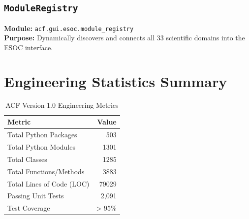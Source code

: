 \documentclass[11pt,a4paper,oneside]{report}
\begin{document}
\section{\texttt{ModuleRegistry}}
\textbf{Module:} \texttt{acf.gui.esoc.module_registry}\\
\textbf{Purpose:} Dynamically discovers and connects all 33 scientific domains into the ESOC interface.

\chapter{Engineering Statistics Summary}
\begin{table}[h!]
\centering
\caption{ACF Version 1.0 Engineering Metrics}
\begin{tabular}{lr}
\toprule
\textbf{Metric} & \textbf{Value} \\
\midrule
Total Python Packages & 503 \\
Total Python Modules & 1301 \\
Total Classes & 1285 \\
Total Functions/Methods & 3883 \\
Total Lines of Code (LOC) & 79029 \\
Passing Unit Tests & 2,091 \\
Test Coverage & > 95\% \\
\bottomrule
\end{tabular}
\end{table}
\end{document}

